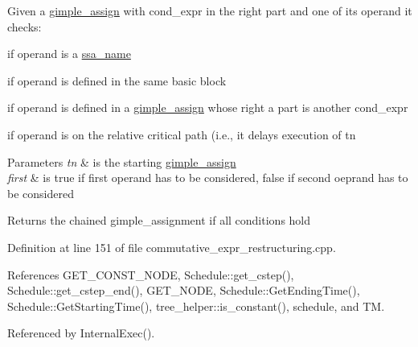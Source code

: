Given a \hyperlink{structgimple__assign}{gimple\+\_\+assign} with cond\+\_\+expr in the right part and one of its operand it checks\+: 


\begin{DoxyItemize}
\item if operand is a \hyperlink{structssa__name}{ssa\+\_\+name}
\item if operand is defined in the same basic block
\item if operand is defined in a \hyperlink{structgimple__assign}{gimple\+\_\+assign} whose right a part is another cond\+\_\+expr
\item if operand is on the relative critical path (i.\+e., it delays execution of tn 
\begin{DoxyParams}{Parameters}
{\em tn} & is the starting \hyperlink{structgimple__assign}{gimple\+\_\+assign} \\
\hline
{\em first} & is true if first operand has to be considered, false if second oeprand has to be considered \\
\hline
\end{DoxyParams}
\begin{DoxyReturn}{Returns}
the chained gimple\+\_\+assignment if all conditions hold 
\end{DoxyReturn}

\end{DoxyItemize}

Definition at line 151 of file commutative\+\_\+expr\+\_\+restructuring.\+cpp.



References G\+E\+T\+\_\+\+C\+O\+N\+S\+T\+\_\+\+N\+O\+DE, Schedule\+::get\+\_\+cstep(), Schedule\+::get\+\_\+cstep\+\_\+end(), G\+E\+T\+\_\+\+N\+O\+DE, Schedule\+::\+Get\+Ending\+Time(), Schedule\+::\+Get\+Starting\+Time(), tree\+\_\+helper\+::is\+\_\+constant(), schedule, and TM.



Referenced by Internal\+Exec().

